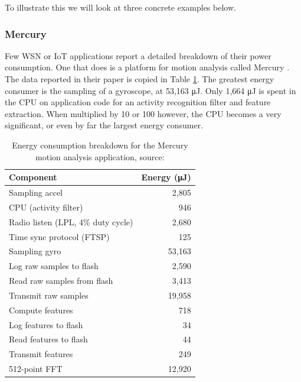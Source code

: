 To illustrate this we will look at three concrete examples below.

\subsubsection{Mercury}
Few WSN or IoT applications report a detailed breakdown of their power consumption. One that does is a platform for motion analysis called Mercury \cite{Lorincz:2009kt}. The data reported in their paper is copied in Table \ref{tbl-mercury-energy}. The greatest energy consumer is the sampling of a gyroscope, at 53,163 μJ. Only 1,664 μJ is spent in the CPU on application code for an activity recognition filter and feature extraction. When multiplied by 10 or 100 however, the CPU becomes a very significant, or even by far the largest energy consumer.

\begin{table}
\caption[Energy consumption breakdown for the Mercury motion analysis application]{Energy consumption breakdown for the Mercury motion analysis application, source: \cite{Lorincz:2009kt}}
\label{tbl-mercury-energy}
    \begin{tabular}{lr} %
    \toprule
    Component                          & Energy (μJ) \\
    \midrule
    \midrule
    Sampling accel                     &  2,805 \\
    CPU (activity filter)              &    946 \\
    Radio listen (LPL, 4\% duty cycle) &  2,680 \\
    Time sync protocol (FTSP)          &    125 \\
    Sampling gyro                      & 53,163 \\
    Log raw samples to flash           &  2,590 \\
    Read raw samples from flash        &  3,413 \\
    Transmit raw samples               & 19,958 \\
    \midrule
    Compute features                   &    718 \\
    Log features to flash              &     34 \\
    Read features to flash             &     44 \\
    Transmit features                  &    249 \\
    \midrule
    512-point FFT                      & 12,920 \\
    \bottomrule
    \end{tabular}
\end{table}


